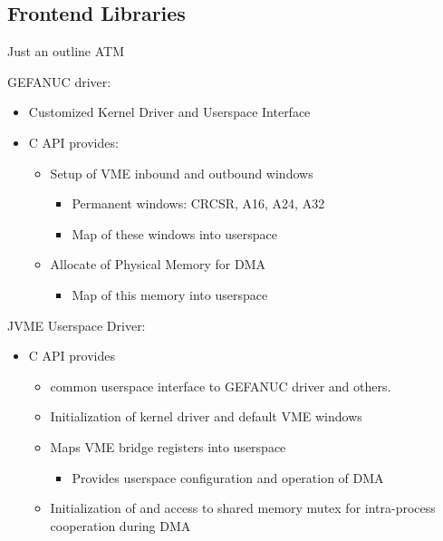 \subsection{Frontend Libraries}

Just an outline ATM

GEFANUC driver:
\begin{itemize}
\item Customized Kernel Driver and Userspace Interface
\item C API provides:
   \begin{itemize}
   \item Setup of VME inbound and outbound windows
      \begin{itemize}
      \item Permanent windows: CRCSR, A16, A24, A32
      \item Map of these windows into userspace
      \end{itemize}
   \item Allocate of Physical Memory for DMA
      \begin{itemize}
      \item Map of this memory into userspace
      \end{itemize}
   \end{itemize}
\end{itemize}

JVME Userspace Driver:
\begin{itemize}
\item C API provides
  \begin{itemize}
  \item common userspace interface to GEFANUC driver and others.
  \item Initialization of kernel driver and default VME windows
  \item Maps VME bridge registers into userspace
    \begin{itemize}
    \item Provides userspace configuration and operation of DMA
    \end{itemize}
  \item Initialization of and access to shared memory mutex for intra-process cooperation during DMA
  \end{itemize}
\end{itemize}

